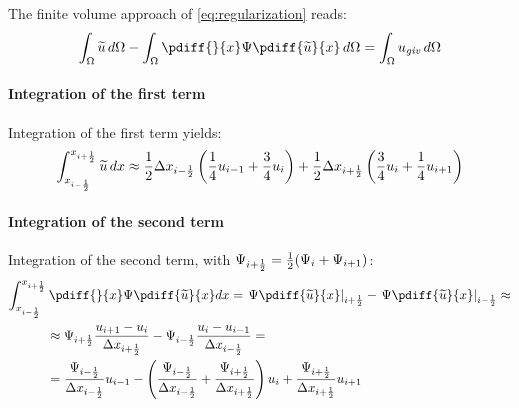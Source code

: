 The finite volume approach of \autoref{eq:regularization} reads:
\begin{align}
\int_\Omega \widetilde u\, d\Omega  - \int_\Omega \pdiff{}{x}  \Psi \pdiff{\widetilde u}{x}\, d\Omega  = \int_\Omega  u_{\it{giv}}\, d\Omega \label{eq:1d_regularization}
\end{align}
\paragraph*{Integration of the first term}
Integration of the first term yields: %
\begin{align}
\int_{x_{i-\frac{1}{2}}}^{x_{i+\frac{1}{2}}} \widetilde u\, dx \approx
\frac{1}{2} \Delta x_{i-\frac{1}{2}} \left( \frac{1}{4} u_{i-1} + \frac{3}{4} u_{i} \right)  +
\frac{1}{2} \Delta x_{i+\frac{1}{2}} \left( \frac{3}{4} u_{i} + \frac{1}{4} u_{i+1} \right)
\end{align}
\paragraph*{Integration of the second term}
Integration of the second term, with $\Psi_{i+\frac{1}{2}} = \frac{1}{2}(\Psi_{i} + \Psi_{i+1})$:
\begin{align}
\int_{x_{i-\half}}^{x_{i+\half}} &\, \pdiff{}{x} \Psi \pdiff{\widetilde u}{x} dx  =
\left. \Psi \pdiff{\widetilde u}{x} \right|_{i+\half} -  \left. \Psi \pdiff{\widetilde u}{x} \right|_{i-\half} \approx \\
& \approx \Psi_{i+\half} \frac{ u_{i+1} -  u_{i}}{\Dx_{i+\half}} - \Psi_{i-\half} \frac{ u_{i} -  u_{i-1}}{\Dx_{i-\half}} = \\
&=  \frac{\Psi_{i-\half}}{\Dx_{i-\half}}   u_{i-1}
-  \left( \frac{\Psi_{i-\half}}{{\Dx_{i-\half}}}
+  \frac{\Psi_{i+\half}}{{\Dx_{i+\half}}} \right)  u_{i}
+ \frac{\Psi_{i+\half}}{{\Dx_{i+\half}}}   u_{i+1}
\end{align}
